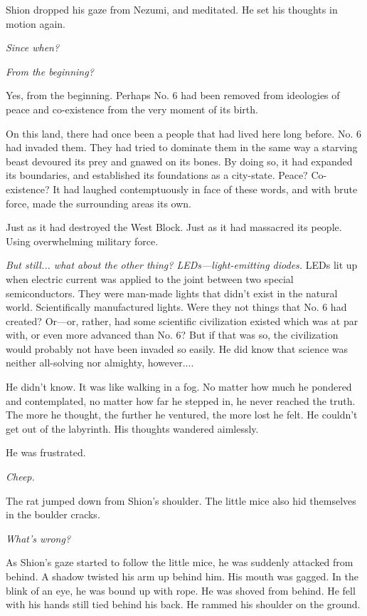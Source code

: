Shion dropped his gaze from Nezumi, and meditated. He set his thoughts
in motion again.

\emph{Since when?}

\emph{From the beginning?}

Yes, from the beginning. Perhaps No. 6 had been removed from ideologies
of peace and co-existence from the very moment of its birth.

On this land, there had once been a people that had lived here long
before. No. 6 had invaded them. They had tried to dominate them in the
same way a starving beast devoured its prey and gnawed on its bones. By
doing so, it had expanded its boundaries, and established its
foundations as a city-state. Peace? Co-existence? It had laughed
contemptuously in face of these words, and with brute force, made the
surrounding areas its own.

Just as it had destroyed the West Block. Just as it had massacred its
people. Using overwhelming military force.

\emph{But still... what about the other thing? LEDs---light-emitting diodes.}
LEDs lit up when electric current was applied to the joint between two
special semiconductors. They were man-made lights that didn't exist in
the natural world. Scientifically manufactured lights. Were they not
things that No. 6 had created? Or---or, rather, had some scientific
civilization existed which was at par with, or even more advanced than
No. 6? But if that was so, the civilization would probably not have been
invaded so easily. He did know that science was neither all-solving nor
almighty, however....

He didn't know. It was like walking in a fog. No matter how much he
pondered and contemplated, no matter how far he stepped in, he never
reached the truth. The more he thought, the further he ventured, the
more lost he felt. He couldn't get out of the labyrinth. His thoughts
wandered aimlessly.

He was frustrated.

\emph{Cheep.}

The rat jumped down from Shion's shoulder. The little mice also hid
themselves in the boulder cracks.

\emph{What's wrong?}

As Shion's gaze started to follow the little mice, he was suddenly
attacked from behind. A shadow twisted his arm up behind him. His mouth
was gagged. In the blink of an eye, he was bound up with rope. He was
shoved from behind. He fell with his hands still tied behind his back.
He rammed his shoulder on the ground.

